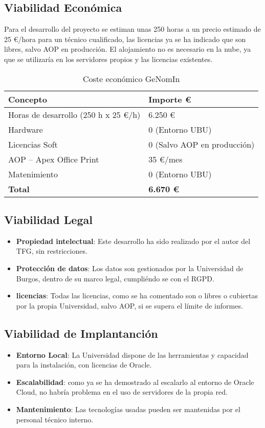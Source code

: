 \subsection{Viabilidad Económica}
Para el desarrollo del proyecto se estiman unas 250 horas a un precio estimado de 25 €/hora para un técnico cualificado, las licencias ya se ha indicado que son libres, salvo \gls{AOP} en producción. El alojamiento no es necesario en la nube, ya que se utilizaría en los servidores propios y las licencias existentes.
\begin{table}[ht]
		\centering
		\begin{tabular}{|p{5cm}|p{5cm}|}
			\hline
			\rowcolor{gray!20}
			\textbf{Concepto} & \textbf{Importe €}\\
			\hline
			Horas de desarrollo (250 h x 25 €/h) & 6.250 € \\
			\hline
			Hardware & 0 (Entorno UBU)\\
			\hline
			Licencias Soft & 0 (Salvo AOP en producción) \\
			\hline
			AOP – Apex Office Print & 35 €/mes \\
			\hline
			Matenimiento & 0 (Entorno UBU) \\
			\hline
			\textbf{Total} & \textbf{6.670 €} \\
			\hline
		\end{tabular}
		\caption{Coste económico GeNomIn}
\end{table}

\subsection{Viabilidad Legal}
\begin{itemize}
	\item \textbf{Propiedad intelectual}: Este desarrollo ha sido realizado por el autor del \acrshort{TFG}, sin restricciones.
	\item \textbf{Protección de datos}: Los datos son gestionados por la Universidad de Burgos, dentro de su marco legal, cumpliéndo se con el \acrshort{RGPD}.
	\item \textbf{licencias}: Todas las licencias, como se ha comentado son o libres o cubiertas por la propia Universidad, salvo \acrshort{AOP}, si se supera el límite de informes.
\end{itemize}
\subsection{Viabilidad de Implantanción}
\begin{itemize}
	\item \textbf{Entorno Local}: La Universidad dispone de las herramientas y capacidad para la instalación, con licencias de Oracle.
	\item \textbf{Escalabilidad}: como ya se ha demostrado al escalarlo al entorno de Oracle Cloud, no habría problema en el uso de servidores de la propia red.
	\item \textbf{Mantenimiento}: Las tecnologías usadas pueden ser mantenidas por el personal técnico interno.
\end{itemize}
